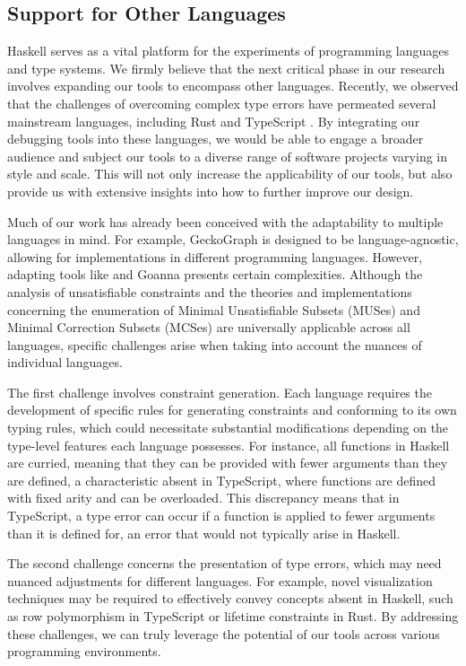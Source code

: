 \subsection*{Support for Other Languages}
Haskell serves as a vital platform for the experiments of programming languages and type systems. We firmly believe that the next critical phase in our research involves expanding our tools to encompass other languages. Recently, we observed that the challenges of overcoming complex type errors have permeated several mainstream languages, including Rust \cite{Zeng2019-ou} and TypeScript \cite{Scarsbrook2023-uq}. By integrating our debugging tools into these languages, we would be able to engage a broader audience and subject our tools to a diverse range of software projects varying in style and scale. This will not only increase the applicability of our tools, but also provide us with extensive insights into how to further improve our design.

Much of our work has already been conceived with the adaptability to multiple languages in mind. For example, GeckoGraph is designed to be language-agnostic, allowing for implementations in different programming languages. However, adapting tools like \chameleon{} and Goanna presents certain complexities. Although the analysis of unsatisfiable constraints and the theories and implementations concerning the enumeration of Minimal Unsatisfiable Subsets (MUSes) and Minimal Correction Subsets (MCSes) are universally applicable across all languages, specific challenges arise when taking into account the nuances of individual languages.

The first challenge involves constraint generation. Each language requires the development of specific rules for generating constraints and conforming to its own typing rules, which could necessitate substantial modifications depending on the type-level features each language possesses. For instance, all functions in Haskell are curried, meaning that they can be provided with fewer arguments than they are defined, a characteristic absent in TypeScript, where functions are defined with fixed arity and can be overloaded. This discrepancy means that in TypeScript, a type error can occur if a function is applied to fewer arguments than it is defined for, an error that would not typically arise in Haskell.

The second challenge concerns the presentation of type errors, which may need nuanced adjustments for different languages. For example, novel visualization techniques may be required to effectively convey concepts absent in Haskell, such as row polymorphism in TypeScript or lifetime constraints in Rust. By addressing these challenges, we can truly leverage the potential of our tools across various programming environments.

